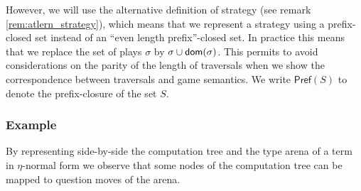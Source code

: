 However, we will use the alternative definition of strategy (see
remark \ref{rem:atlern_strategy}), which means that we represent a
strategy using a prefix-closed set instead of an ``even length
prefix''-closed set. In practice this means that we replace the set
of plays $\sigma$ by $\sigma \cup \textsf{dom}(\sigma)$. This
permits to avoid considerations on the parity of the length of
traversals when we show the correspondence between traversals and
game semantics. We write $\textsf{Pref}(S)$ to denote the
prefix-closure of the set $S$.

\subsubsection{Example}

By representing side-by-side the computation tree and the type arena of a term in $\eta$-normal form we observe
that some nodes of the computation tree can be mapped to question moves of the arena.

